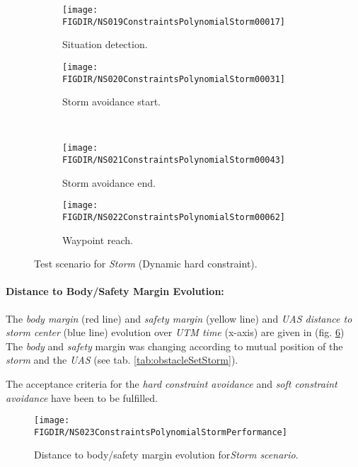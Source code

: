     \begin{figure}[H]
        \centering
        \begin{subfigure}{0.48\textwidth}
        	\centering
            \texttt{[image: \\FIGDIR/NS019ConstraintsPolynomialStorm00017]}
            \caption{Situation detection.}
            \label{fig:stromSituationDetection}
        \end{subfigure}
        \begin{subfigure}{0.48\textwidth}
        	\centering
            \texttt{[image: \\FIGDIR/NS020ConstraintsPolynomialStorm00031]} 
            \caption{Storm avoidance start.}
            \label{fig:stormAvoidanceStart}
        \end{subfigure}
        \\
        \begin{subfigure}{0.48\textwidth}
        	\centering
            \texttt{[image: \\FIGDIR/NS021ConstraintsPolynomialStorm00043]} 
            \caption{Storm avoidance end.}
            \label{fig:stormAvoidanceEnd}
        \end{subfigure}
        \begin{subfigure}{0.48\textwidth}
        	\centering
            \texttt{[image: \\FIGDIR/NS022ConstraintsPolynomialStorm00062]} 
            \caption{Waypoint reach.}
            \label{fig:stormWaypointReach}
        \end{subfigure}
        \caption{Test scenario for \emph{Storm} (Dynamic hard constraint). }
        \label{fig:testCaseStormAvoidance}
    \end{figure}
    
    \paragraph{Distance to Body/Safety Margin Evolution:} The \emph{body margin} (red line) and \emph{safety margin} (yellow line) and \emph{UAS distance to storm center} (blue line) evolution over \emph{UTM time} (x-axis) are given in (fig. \ref{fig:testCaseStormAvoidancePerformance}) The \emph{body} and \emph{safety} margin was changing according to mutual position of the \emph{storm} and the \emph{UAS} (see tab. \ref{tab:obstacleSetStorm}). 
    
    The acceptance criteria for the \emph{hard constraint avoidance} and \emph{soft constraint avoidance} have been to be fulfilled. 
    
    \begin{figure}[H]
        \centering
        \texttt{[image: \\FIGDIR/NS023ConstraintsPolynomialStormPerformance]} 
        \caption{Distance to body/safety margin evolution for\emph{Storm scenario}.}
        \label{fig:testCaseStormAvoidancePerformance}
    \end{figure}
    
